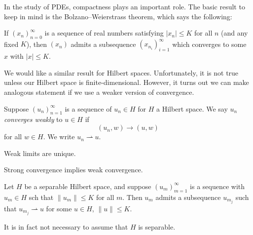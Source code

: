 \documentclass[a4paper]{article}
\begin{document}
In the study of PDEs, compactness plays an important role. The basic result to keep in mind is the Bolzano--Weierstrass theorem, which says the following:
\begin{thm}
  If $(x_n)_{n = 0}^\infty$ is a sequence of real numbers satisfying $|x_n| \leq K$ for all $n$ (and any fixed $K$), then $(x_n)$ admits a subsequence $(x_{n_i})_{i = 1}^\infty$ which converges to some $x$ with $|x| \leq K$.
\end{thm}

We would like a similar result for Hilbert spaces. Unfortunately, it is not true unless our Hilbert space is finite-dimensional. However, it turns out we can make analogous statement if we use a weaker version of convergence.

\begin{defi}
  Suppose $(u_n)_{n = 1}^\infty$ is a sequence of $u_n \in H$ for $H$ a Hilbert space. We say $u_n$ \emph{converges weakly} to $u \in H$ if
  \[
    (u_n, w) \to (u, w)
  \]
  for all $w \in H$. We write $u_n \rightharpoonup u$.
\end{defi}

\begin{lemma}
  Weak limits are unique.\qedsym
\end{lemma}

\begin{lemma}
  Strong convergence implies weak convergence.\qedsym
\end{lemma}

\begin{thm}
  Let $H$ be a separable Hilbert space, and suppose $(u_m)_{m = 1}^\infty$ is a sequence with $u_m \in H$ sch that $\|u_m\| \leq K$ for all $m$. Then $u_m$ admits a subsequence $u_{m_j}$ such that $u_{m_j} \rightharpoonup u$ for some $u \in H$, $\|u\| \leq K$.
\end{thm}
It is in fact not necessary to assume that $H$ is separable.
\end{document}
